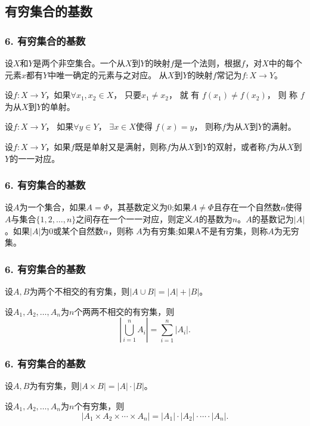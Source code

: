 \documentclass{beamer}
\begin{document}
\begin{CJK*}{UTF8}{gbsn}
\section{有穷集合的基数}
\begin{frame}
  \frametitle{6. 有穷集合的基数}
  \begin{Def}
    设$X$和$Y$是两个非空集合。一个从$X$到$Y$的\alert{映射}$f$是一个法则，根据$f$，对$X$中的每个元素$x$都有$Y$中唯一确定的元素与之对应。
    从$X$到$Y$的映射$f$常记为$f:X\to Y$。
  \end{Def}
    \begin{Def}
    设$f:X\to Y$，如果$\forall x_1, x_2 \in X$， 只要$x_1 \neq x_2$，  就 有 $f(x_1) \neq f(x_2)$，   则 称 $f$ 为从$X$到$Y$的\alert{单射}。
  \end{Def}
  \begin{Def}
    设$f:X\to Y$， 如果$\forall y \in Y$， $\exists x \in X$使得 $f(x) = y$， 则称$f$为从$X$到$Y$的\alert{满射}。
  \end{Def}
  \begin{Def}
    设$f:X\to Y$，如果$f$既是单射又是满射，则称$f$为从$X$到$Y$的\alert{双射}，或者称$f$为从$X$到$Y$的\alert{一一对应}。
  \end{Def}
\end{frame}

\begin{frame}
  \frametitle{6. 有穷集合的基数}

  \begin{Def}
设$A$为一个集合，如果$A=\Phi$，其\alert{基数}定义为$0$;如果$A \neq \Phi$且存在一个自然数$n$使得$A$与集合$\{1,2,\ldots, n\}$之间存在一个一一对应，则定义$A$的\alert{基数}为$n$。$A$的基数记为$|A|$。如果$|A|$为0或某个自然数$n$，则称
$A$为\alert{有穷集};如果A不是有穷集，则称$A$为\alert{无穷集}。   
  \end{Def}
\end{frame}

\begin{frame}
  \frametitle{6. 有穷集合的基数}
  \begin{Thm}
    设$A,B$为两个不相交的有穷集，则$|A \cup B| = |A| + |B|$。
  \end{Thm}
\pause
  \begin{Thm}
    设$A_1,A_2, \ldots, A_n$为$n$个两两不相交的有穷集，则\[|\bigcup_{i=1}^{n}A_i|=\sum_{i=1}^{n}|A_i|.\]
  \end{Thm}
\end{frame}

\begin{frame}
  \frametitle{6. 有穷集合的基数}
  \begin{Thm}
    设$A,B$为有穷集，则$|A \times B| = |A| \cdot |B|$。
  \end{Thm}
\pause
  \begin{Thm}
    设$A_1,A_2, \ldots, A_n$为$n$个有穷集，则\[|A_1 \times A_2 \times \cdots \times A_n|=|A_1|\cdot |A_2| \cdot \cdots \cdot |A_n|.\]
  \end{Thm}
\end{frame}


\end{CJK*}
\end{document}

